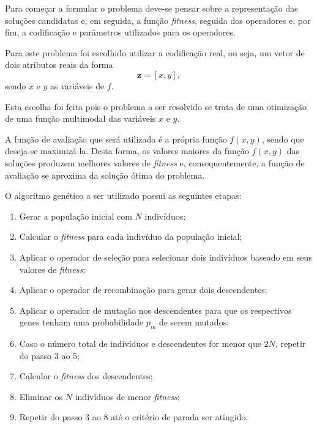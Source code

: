 \documentclass[a4paper, 12pt]{article}
\newcommand{\fitness}{\textit{fitness}\xspace}
\begin{document}
Para começar a formular o problema deve-se pensar sobre a representação das soluções candidatas e, em seguida, a função \fitness, seguida dos operadores e, por fim, a codificação e parâmetros utilizados para os operadores.

Para este problema foi escolhido utilizar a codificação real, ou seja, um vetor de dois atributos reais da forma
\begin{equation}
    \mathbf{z} = [x, y],
\end{equation} 
sendo $x$ e $y$ as variáveis de $f$.

Esta escolha foi feita pois o problema a ser resolvido se trata de uma otimização de uma função multimodal das variáveis $x$ e $y$.

A função de avaliação que será utilizada é a própria função $f(x, y)$, sendo que deseja-se maximizá-la. 
Desta forma, os valores maiores da função $f(x,y)$ das soluções produzem melhores valores de \textit{fitness} e, consequentemente, a função de avaliação se aproxima da solução ótima do problema.

O algoritmo genético a ser utilizado possui as seguintes etapas:
\begin{enumerate}
    \item Gerar a população inicial com $N$ indivíduos;
    \item Calcular o \textit{fitness} para cada indivíduo da população inicial;
    \item Aplicar o operador de seleção para selecionar dois indivíduos baseado em seus valores de \textit{fitness};
    \item Aplicar o operador de recombinação para gerar dois descendentes;
    \item Aplicar o operador de mutação nos descendentes para que os respectivos genes tenham uma probabilidade $p_m$ de serem mutados;
    \item Caso o número total de indivíduos e descendentes for menor que $2N$, repetir do passo 3 ao 5;
    \item Calcular o \textit{fitness} dos descendentes;
    \item Eliminar os $N$ indivíduos de menor \textit{fitness};
    \item Repetir do passo 3 ao 8 até o critério de parada ser atingido.
\end{enumerate}
\end{document}
